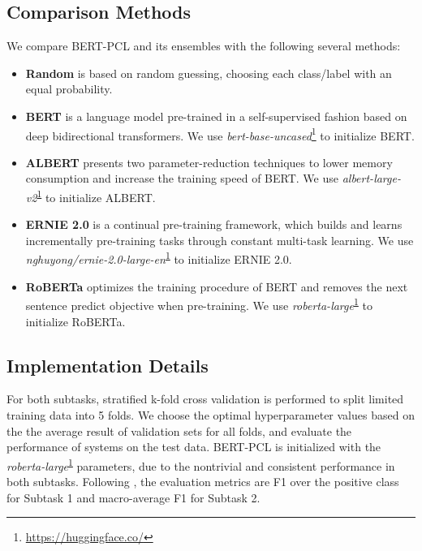 \documentclass[11pt]{article}
\begin{document}
\subsection{Comparison Methods}

We compare BERT-PCL and its ensembles with the following several methods:
\begin{itemize}
    \item \textbf{Random} is based on random guessing, choosing each class/label with an equal probability.
\item \textbf{BERT}  \citep{DBLP:conf/naacl/DevlinCLT19} is a language model pre-trained in a self-supervised fashion based on deep bidirectional transformers.  We use \textit{bert-base-uncased}\footnote{\url{https://huggingface.co/}\label{code}} to initialize BERT. 
\item \textbf{ALBERT} \citep{DBLP:conf/iclr/LanCGGSS20} presents two parameter-reduction techniques to lower memory consumption and increase the training speed of BERT. 
    We use \textit{albert-large-v2}\textsuperscript{\ref{code}} to initialize ALBERT. 
    \item \textbf{ERNIE 2.0} \citep{DBLP:conf/aaai/SunWLFTWW20} is a continual pre-training framework, which builds and learns incrementally pre-training tasks through constant multi-task learning.
    We use \textit{nghuyong/ernie-2.0-large-en}\textsuperscript{\ref{code}} to initialize ERNIE 2.0. 
    \item \textbf{RoBERTa} \citep{DBLP:journals/corr/abs-1907-11692} optimizes the training procedure of BERT and removes the next sentence predict objective when pre-training.
    We use \textit{roberta-large}\textsuperscript{\ref{code}} to initialize RoBERTa. 
\end{itemize}

\subsection{Implementation Details}
For both subtasks, stratified k-fold cross validation  \citep{DBLP:conf/ijcai/Kohavi95,DBLP:conf/pkdd/SechidisTV11} is performed to split limited training data into 5 folds.
We choose the optimal hyperparameter values based on the the average result of validation sets for all folds, and evaluate the performance of systems on the test data.
BERT-PCL is initialized with the \textit{roberta-large}\textsuperscript{\ref{code}} parameters, due to the nontrivial and consistent performance in both subtasks. Following \citet{perez2020don,perezalmendros2022semeval}, the evaluation metrics are F1 over the positive class for Subtask 1 and macro-average F1 for Subtask 2.
\end{document}
